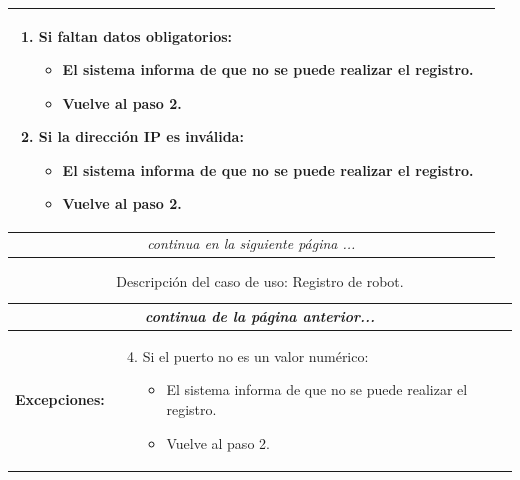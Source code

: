 \begin{table}[H]
\begin{center}
\begin{tabular}{|p{3.5cm}|p{10cm}|}
{\begin{enumerate}
          \item Si faltan datos obligatorios:
          \begin{itemize}
           \item El sistema informa de que no se puede realizar el registro.
           \item Vuelve al paso 2.
          \end{itemize}
	  \item Si la dirección IP es inválida:
	    \begin{itemize}
	      \item El sistema informa de que no se puede realizar el registro.
	      \item Vuelve al paso 2.
	   \end{itemize}	   
         \end{enumerate}
         }\\
     \hline
     \multicolumn{2}{c}{\emph{continua en la siguiente página ...}}\\
    \end{tabular}
  \end{center}
\end{table}    


\begin{table}[H]
  \begin{center}
    \begin{tabular}{|p{3.5cm}|p{10cm}|}
     \multicolumn{2}{c}{\emph{continua de la página anterior...}}\\
     \hline
         {\textbf{Excepciones:}} & {
         \begin{enumerate}
           \setcounter{enumi}{3}
	    \item Si el puerto no es un valor numérico:
	    \begin{itemize}
	      \item El sistema informa de que no se puede realizar el registro.
	      \item Vuelve al paso 2.
	    \end{itemize}
          \end{enumerate}
          }\\
       \hline
    \end{tabular}
  \end{center}
\caption{Descripción del caso de uso: Registro de robot.}
\end{table}



